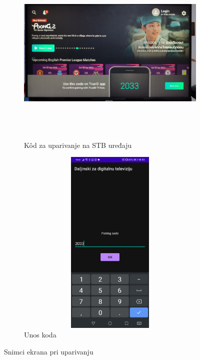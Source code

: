 \documentclass[implementacija.tex]{subfiles}
\begin{document}
\begin{figure}
    \centering
    \begin{subfigure}[b]{0.6\textwidth}
        \centering
        \includegraphics[width=10cm, height=9cm,keepaspectratio]{Implementacija/snimci_ekrana/8_kod_za_uparivanje_na_stb.jpg}
         \caption{K\^{o}d za uparivanje na STB uređaju}
        \label{fig:kod_na_stb}
    \end{subfigure}
    \hfill
    \begin{subfigure}[b]{0.3\textwidth}
        \centering
        \includegraphics[width=10cm, height=9cm, keepaspectratio]{Implementacija/snimci_ekrana/7_unos_koda_za_uparivanje.jpg}
        \caption{Unos koda}
        \label{fig:kod_na_mobilnom}
    \end{subfigure}
    \caption{Snimci ekrana pri uparivanju}
    \label{fig:obavestenja}
\end{figure}
\end{document}
